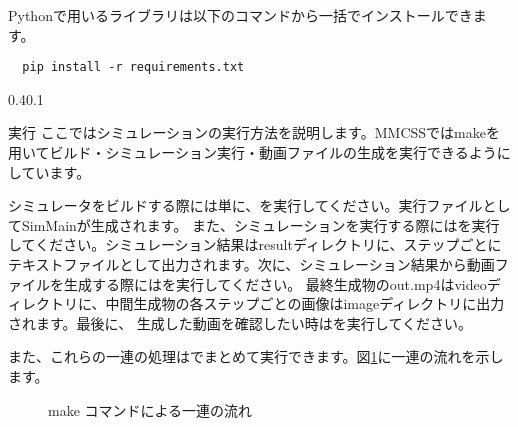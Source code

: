 \documentclass[vipdfmx,a4paper,11pt]{jsarticle}
\makeatletter
\renewcommand{\section}{%
  \@startsection{section}{1}{\z@}%
  {0.4\Cvs}{0.1\Cvs}%
  {\normalfont\large\headfont\raggedright}}
\makeatother
\begin{document}
Pythonで用いるライブラリは以下のコマンドから一括でインストールできます。

\begin{lstlisting}
  pip install -r requirements.txt
\end{lstlisting}

\section{実行}
ここではシミュレーションの実行方法を説明します。MMCSSではmakeを用いてビルド・シミュレーション実行・動画ファイルの生成を実行できるようにしています。

シミュレータをビルドする際には単に、を実行してください。実行ファイルとしてSimMainが生成されます。
また、シミュレーションを実行する際にはを実行してください。シミュレーション結果はresultディレクトリに、ステップごとに
テキストファイルとして出力されます。次に、シミュレーション結果から動画ファイルを生成する際にはを実行してください。
最終生成物のout.mp4はvideoディレクトリに、中間生成物の各ステップごとの画像はimageディレクトリに出力されます。最後に、
生成した動画を確認したい時はを実行してください。


また、これらの一連の処理はでまとめて実行できます。図\ref{fig:appMake}に一連の流れを示します。

\begin{figure}[tbp]
  \centering
  \caption{make コマンドによる一連の流れ}
  \label{fig:appMake}
\end{figure}
\end{document}
